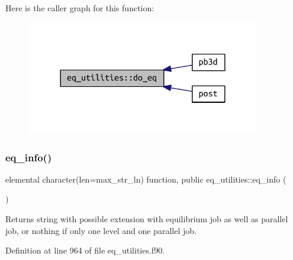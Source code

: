 Here is the caller graph for this function\+:\nopagebreak
\begin{figure}[H]
\begin{center}
\leavevmode
\includegraphics[width=288pt]{namespaceeq__utilities_a5109472305101af3a15e8e8717c426fd_icgraph}
\end{center}
\end{figure}
\mbox{\label{namespaceeq__utilities_a34c5ddab45a54a6c738e5e0b8c7d55d6}} 
\subsubsection{\texorpdfstring{eq\+\_\+info()}{eq\_info()}}
{\footnotesize\ttfamily elemental character(len=max\+\_\+str\+\_\+ln) function, public eq\+\_\+utilities\+::eq\+\_\+info (\begin{DoxyParamCaption}{ }\end{DoxyParamCaption})}



Returns string with possible extension with equilibrium job as well as parallel job, or nothing if only one level and one parallel job. 



Definition at line 964 of file eq\+\_\+utilities.\+f90.

